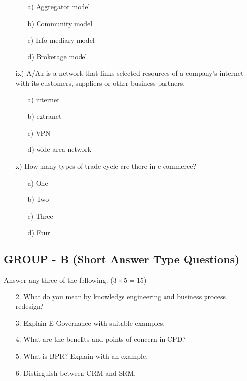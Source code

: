 \begin{enumerate}
\begin{enumerate}
        \item[a)] Aggregator model
        \item[b)] Community model
        \item[c)] Info-mediary model
        \item[d)] Brokerage model.
    \end{enumerate}
    \item[ix)] A/An \underline{\hspace{2cm}} is a network that links selected resources of a company's internet with its customers, suppliers or other business partners.
    \begin{enumerate}
        \item[a)] internet
        \item[b)] extranet
        \item[c)] VPN
        \item[d)] wide area network
    \end{enumerate}
    \item[x)] How many types of trade cycle are there in e-commerce?
    \begin{enumerate}
        \item[a)] One
        \item[b)] Two
        \item[c)] Three
        \item[d)] Four
    \end{enumerate}
\end{enumerate}

\subsection*{GROUP - B (Short Answer Type Questions)}
Answer any three of the following. ($3 \times 5 = 15$)
\begin{enumerate}
    \item[2.] What do you mean by knowledge engineering and business process redesign?
    \item[3.] Explain E-Governance with suitable examples.
    \item[4.] What are the benefits and points of concern in CPD?
    \item[5.] What is BPR? Explain with an example.
    \item[6.] Distinguish between CRM and SRM.
\end{enumerate}

